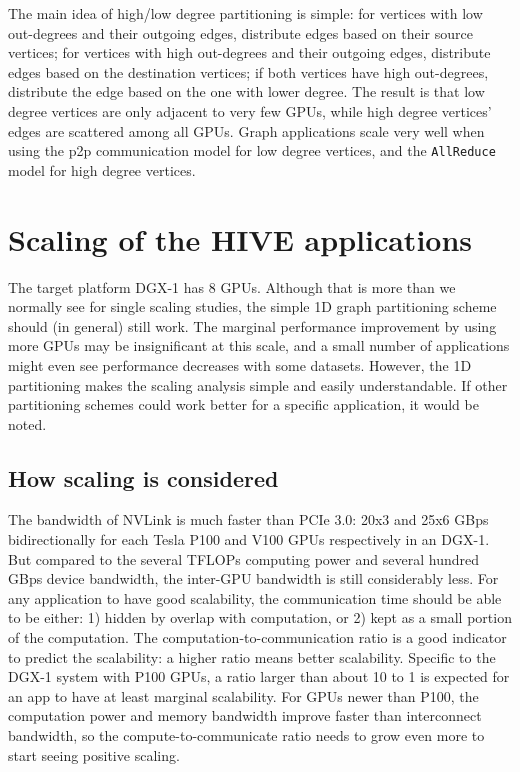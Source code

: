 \documentclass[10pt,oneside]{memoir}
\begin{document}
The main idea of high/low degree partitioning is simple: for vertices
with low out-degrees and their outgoing edges, distribute edges based on
their source vertices; for vertices with high out-degrees and their
outgoing edges, distribute edges based on the destination vertices; if
both vertices have high out-degrees, distribute the edge based on the
one with lower degree. The result is that low degree vertices are only
adjacent to very few GPUs, while high degree vertices' edges are
scattered among all GPUs. Graph applications scale very well when using
the p2p communication model for low degree vertices, and the
\texttt{AllReduce} model for high degree vertices.

\hypertarget{scaling-of-the-hive-applications}{%
\section{Scaling of the HIVE
applications}\label{scaling-of-the-hive-applications}}

The target platform DGX-1 has 8 GPUs. Although that is more than we
normally see for single scaling studies, the simple 1D graph
partitioning scheme should (in general) still work. The marginal
performance improvement by using more GPUs may be insignificant at this
scale, and a small number of applications might even see performance
decreases with some datasets. However, the 1D partitioning makes the
scaling analysis simple and easily understandable. If other partitioning
schemes could work better for a specific application, it would be noted.

\hypertarget{how-scaling-is-considered}{%
\subsection{How scaling is considered}\label{how-scaling-is-considered}}

The bandwidth of NVLink is much faster than PCIe 3.0: 20x3 and 25x6 GBps
bidirectionally for each Tesla P100 and V100 GPUs respectively in an
DGX-1. But compared to the several TFLOPs computing power and several
hundred GBps device bandwidth, the inter-GPU bandwidth is still
considerably less. For any application to have good scalability, the
communication time should be able to be either: 1) hidden by overlap
with computation, or 2) kept as a small portion of the computation. The
computation-to-communication ratio is a good indicator to predict the
scalability: a higher ratio means better scalability. Specific to the
DGX-1 system with P100 GPUs, a ratio larger than about 10 to 1 is
expected for an app to have at least marginal scalability. For GPUs
newer than P100, the computation power and memory bandwidth improve
faster than interconnect bandwidth, so the compute-to-communicate ratio
needs to grow even more to start seeing positive scaling.
\end{document}

